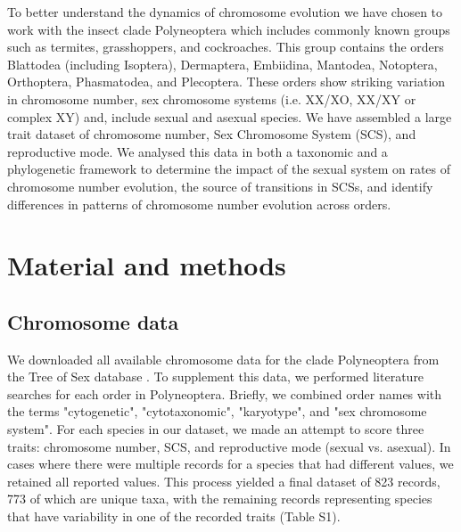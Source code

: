 \documentclass[]{rsos}%
\begin{document}
To better understand the dynamics of chromosome evolution we have chosen to work with the insect clade Polyneoptera which includes commonly known groups such as termites, grasshoppers, and cockroaches.
This group contains the orders Blattodea (including Isoptera), Dermaptera, Embiidina, Mantodea, Notoptera, Orthoptera, Phasmatodea, and Plecoptera.
These orders show striking variation in chromosome number, sex chromosome systems (i.e. XX/XO, XX/XY or complex XY) and, include sexual and asexual species. 
We have assembled a large trait dataset of chromosome number, Sex Chromosome System (SCS), and reproductive mode.
We analysed this data in both a taxonomic and a phylogenetic framework to determine the impact of the sexual system on rates of chromosome number evolution, the source of transitions in SCSs, and identify differences in patterns of chromosome number evolution across orders.

\section{Material and methods}

\subsection{Chromosome data}
We downloaded all available chromosome data for the clade Polyneoptera from the Tree of Sex database \cite{blackmon2016,TOS2014}.
To supplement this data, we performed literature searches for each order in Polyneoptera.
Briefly, we combined order names with the terms "cytogenetic", "cytotaxonomic", "karyotype", and "sex chromosome system".
For each species in our dataset, we made an attempt to score three traits: chromosome number, SCS, and reproductive mode (sexual vs. asexual).
In cases where there were multiple records for a species that had different values, we retained all reported values.
This process yielded a final dataset of 823 records, 773 of which are unique taxa, with the remaining records representing species that have variability in one of the recorded traits (Table S1).
\end{document}
